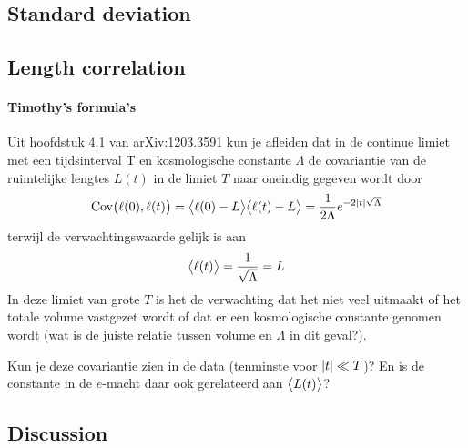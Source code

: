 \subsection{Standard deviation}

\subsection{Length correlation}
\paragraph{Timothy's formula's}
Uit hoofdstuk 4.1 van arXiv:1203.3591 kun je afleiden dat in de continue
limiet met een tijdsinterval T en kosmologische constante $\Lambda$ de
covariantie van de ruimtelijke lengtes $L(t)$ in de limiet $T$ naar oneindig gegeven wordt door
\begin{equation}
    \text{Cov}\big(\ell(0), \ell(t)\big) = \big\langle \ell(0) - L \big\rangle \big\langle \ell(t) - L \big\rangle
    = \frac{1}{2\Lambda} e^{- 2\abs{t}\sqrt{\Lambda}}
\end{equation}
terwijl de verwachtingswaarde gelijk is aan
\begin{equation}
    \big\langle \ell(t) \big\rangle = \frac{1}{\sqrt{\Lambda}} = L
\end{equation}
In deze limiet van grote $T$ is het de verwachting dat het niet veel
uitmaakt of het totale volume vastgezet wordt of dat er een
kosmologische constante genomen wordt (wat is de juiste relatie tussen
volume en $\Lambda$ in dit geval?).

Kun je deze covariantie zien in de data (tenminste voor $\abs{t} \ll T$)? En is
de constante in de $e$-macht daar ook gerelateerd aan $\big\langle L(t) \big\rangle$?



\subsection{Discussion}
